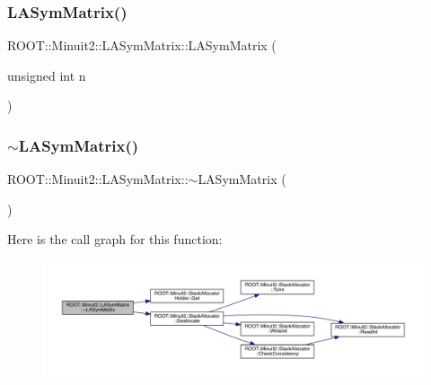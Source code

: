 \subsubsection{\texorpdfstring{LASymMatrix()}{LASymMatrix()}\hspace{0.1cm}{\footnotesize\ttfamily [1/20]}}
{\footnotesize\ttfamily R\+O\+O\+T\+::\+Minuit2\+::\+L\+A\+Sym\+Matrix\+::\+L\+A\+Sym\+Matrix (\begin{DoxyParamCaption}\item[{unsigned int}]{n }\end{DoxyParamCaption})\hspace{0.3cm}{\ttfamily [inline]}}

\mbox{\label{classROOT_1_1Minuit2_1_1LASymMatrix_a6de4c2f5940002a13411348985d1b784}} 
\subsubsection{\texorpdfstring{$\sim$LASymMatrix()}{~LASymMatrix()}\hspace{0.1cm}{\footnotesize\ttfamily [1/2]}}
{\footnotesize\ttfamily R\+O\+O\+T\+::\+Minuit2\+::\+L\+A\+Sym\+Matrix\+::$\sim$\+L\+A\+Sym\+Matrix (\begin{DoxyParamCaption}{ }\end{DoxyParamCaption})\hspace{0.3cm}{\ttfamily [inline]}}

Here is the call graph for this function\+:
\nopagebreak
\begin{figure}[H]
\begin{center}
\leavevmode
\includegraphics[width=350pt]{d3/d72/classROOT_1_1Minuit2_1_1LASymMatrix_a6de4c2f5940002a13411348985d1b784_cgraph}
\end{center}
\end{figure}
\mbox{\label{classROOT_1_1Minuit2_1_1LASymMatrix_ac74006982da0bcda789c1237e0022033}} 
